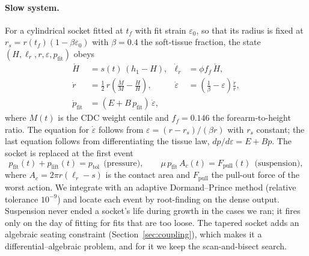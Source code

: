 \documentclass[11pt]{article}
\begin{document}
\paragraph{Slow system.} For a cylindrical socket fitted at $t_f$ with fit strain $\varepsilon_0$, so that its radius is fixed at $r_s=r(t_f)(1-\beta\varepsilon_0)$ with $\beta=0.4$ the soft-tissue fraction, the state $(H,\ell_r,r,\varepsilon,p_{\mathrm{fit}})$ obeys
\begin{align}
\dot H &= s(t)\,(h_1-H), &
\dot\ell_r &= \phi f_f\,\dot H, \label{eq:ode1}\\
\dot r &= \tfrac12\,r\left(\frac{\dot M}{M}-\frac{\dot H}{H}\right), &
\dot\varepsilon &= \left(\frac1\beta-\varepsilon\right)\frac{\dot r}{r}, \label{eq:ode2}\\
\dot p_{\mathrm{fit}} &= (E+B\,p_{\mathrm{fit}})\,\dot\varepsilon, \label{eq:ode3}
\end{align}
where $M(t)$ is the CDC weight centile and $f_f=0.146$ the forearm-to-height ratio. The equation for $\dot\varepsilon$ follows from $\varepsilon=(r-r_s)/(\beta r)$ with $r_s$ constant; the last equation follows from differentiating the tissue law, $dp/d\varepsilon=E+Bp$. The socket is replaced at the first event
\begin{equation}
p_{\mathrm{fit}}(t)+p_{\mathrm{lift}}(t)=p_{\mathrm{tol}}\ \ \text{(pressure)},\qquad
\mu\,p_{\mathrm{fit}}\,A_c(t)=F_{\mathrm{pull}}(t)\ \ \text{(suspension)},
\end{equation}
where $A_c=2\pi r(\ell_r-s)$ is the contact area and $F_{\mathrm{pull}}$ the pull-out force of the worst action. We integrate with an adaptive Dormand--Prince method (relative tolerance $10^{-9}$) and locate each event by root-finding on the dense output. Suspension never ended a socket's life during growth in the cases we ran; it fires only on the day of fitting for fits that are too loose. The tapered socket adds an algebraic seating constraint (Section~\ref{sec:coupling}), which makes it a differential--algebraic problem, and for it we keep the scan-and-bisect search.
\end{document}
